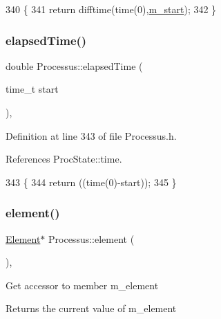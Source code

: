 \begin{DoxyCode}
340                        \{
341     \textcolor{keywordflow}{return} difftime(time(0),\hyperlink{classProcessus_a8ec00b2e12c5beada932610f30218e93}{m\_start});
342   \}
\end{DoxyCode}
\mbox{\label{classProcessus_a06d3815ad56593dfd0d3c1f534f8b146}} 
\subsubsection{\texorpdfstring{elapsed\+Time()}{elapsedTime()}\hspace{0.1cm}{\footnotesize\ttfamily [2/2]}}
{\footnotesize\ttfamily double Processus\+::elapsed\+Time (\begin{DoxyParamCaption}\item[{time\+\_\+t}]{start }\end{DoxyParamCaption})\hspace{0.3cm}{\ttfamily [inline]}, {\ttfamily [inherited]}}



Definition at line 343 of file Processus.\+h.



References Proc\+State\+::time.


\begin{DoxyCode}
343                                    \{
344     \textcolor{keywordflow}{return} ((time(0)-start));
345   \}
\end{DoxyCode}
\mbox{\label{classProcessus_a6fe155527431a7190b7d44d600b9608d}} 
\subsubsection{\texorpdfstring{element()}{element()}}
{\footnotesize\ttfamily \hyperlink{classElement}{Element}$\ast$ Processus\+::element (\begin{DoxyParamCaption}{ }\end{DoxyParamCaption})\hspace{0.3cm}{\ttfamily [inline]}, {\ttfamily [inherited]}}

Get accessor to member m\+\_\+element \begin{DoxyReturn}{Returns}
the current value of m\+\_\+element 
\end{DoxyReturn}


